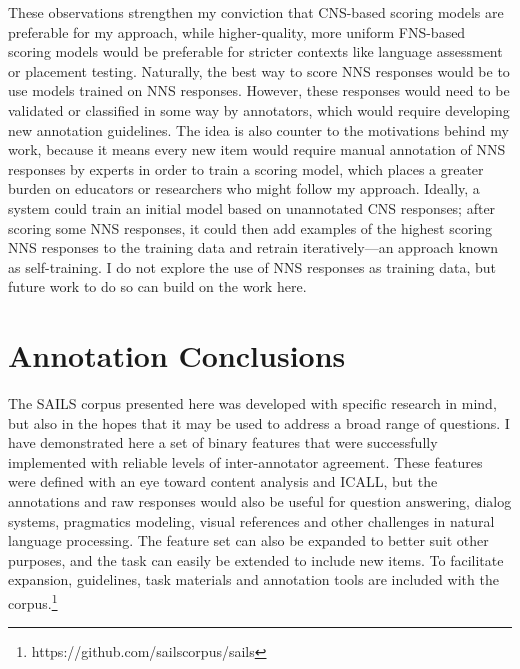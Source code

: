 These observations strengthen my conviction that CNS-based scoring models are preferable for my approach, while higher-quality, more uniform FNS-based scoring models would be preferable for stricter contexts like language assessment or placement testing. Naturally, the best way to score NNS responses would be to use models trained on NNS responses. However, these responses would need to be validated or classified in some way by annotators, which would require developing new annotation guidelines. The idea is also counter to the motivations behind my work, because it means every new item would require manual annotation of NNS responses by experts in order to train a scoring model, which places a greater burden on educators or researchers who might follow my approach. Ideally, a system could train an initial model based on unannotated CNS responses; after scoring some NNS responses, it could then add examples of the highest scoring NNS responses to the training data and retrain iteratively---an approach known as self-training. I do not explore the use of NNS responses as training data, but future work to do so can build on the work here.




\section{Annotation Conclusions}
\label{sec:annotation-conclusions}

The SAILS corpus presented here was developed with specific research in mind, but also in the hopes that it may be used to address a broad range of questions. I have demonstrated here a set of binary features that were successfully implemented with reliable levels of inter-annotator agreement. These features were defined with an eye toward content analysis and ICALL, but the annotations and raw responses would also be useful for question answering, dialog systems, pragmatics modeling, visual references and other challenges in natural language processing. The feature set can also be expanded to better suit other purposes, and the task can easily be extended to include new items. To facilitate expansion, guidelines, task materials and annotation tools are included with the corpus.\footnote{https://github.com/sailscorpus/sails}

